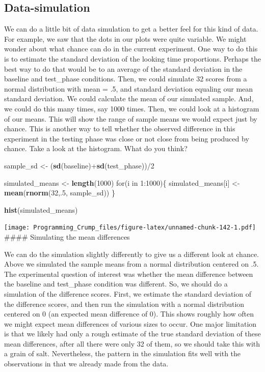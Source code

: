 \documentclass[]{book}
\newenvironment{Shaded}{\begin{snugshade}}{\end{snugshade}}
\newcommand{\KeywordTok}[1]{\textcolor[rgb]{0.13,0.29,0.53}{\textbf{{#1}}}}
\newcommand{\DecValTok}[1]{\textcolor[rgb]{0.00,0.00,0.81}{{#1}}}
\newcommand{\StringTok}[1]{\textcolor[rgb]{0.31,0.60,0.02}{{#1}}}
\newcommand{\NormalTok}[1]{{#1}}
\theoremstyle{definition}
\theoremstyle{definition}
\theoremstyle{definition}
\theoremstyle{remark}
\begin{document}
\subsection{Data-simulation}\label{data-simulation}

We can do a little bit of data simulation to get a better feel for this
kind of data. For example, we saw that the dots in our plots were quite
variable. We might wonder about what chance can do in the current
experiment. One way to do this is to estimate the standard deviation of
the looking time proportions. Perhaps the best way to do that would be
to an average of the standard deviation in the baseline and test\_phase
conditions. Then, we could simulate 32 scores from a normal distribution
with mean = .5, and standard deviation equaling our mean standard
deviation. We could calculate the mean of our simulated sample. And, we
could do this many times, say 1000 times. Then, we could look at a
histogram of our means. This will show the range of sample means we
would expect just by chance. This is another way to tell whether the
observed difference in this experiment in the testing phase was close or
not close from being produced by chance. Take a look at the histogram.
What do you think?

\begin{Shaded}
\begin{Highlighting}[]
\NormalTok{sample_sd   <-}\StringTok{ }\NormalTok{(}\KeywordTok{sd}\NormalTok{(baseline)+}\KeywordTok{sd}\NormalTok{(test_phase))/}\DecValTok{2}

\NormalTok{simulated_means <-}\StringTok{ }\KeywordTok{length}\NormalTok{(}\DecValTok{1000}\NormalTok{)}
\NormalTok{for(i in }\DecValTok{1}\NormalTok{:}\DecValTok{1000}\NormalTok{)\{}
 \NormalTok{simulated_means[i] <-}\StringTok{ }\KeywordTok{mean}\NormalTok{(}\KeywordTok{rnorm}\NormalTok{(}\DecValTok{32}\NormalTok{,.}\DecValTok{5}\NormalTok{, sample_sd))}
\NormalTok{\}}

\KeywordTok{hist}\NormalTok{(simulated_means)}
\end{Highlighting}
\end{Shaded}

\texttt{[image: Programming\_Crump\_files/figure-latex/unnamed-chunk-142-1.pdf]}
\#\#\#\# Simulating the mean differences

We can do the simulation slightly differently to give us a different
look at chance. Above we simulated the sample means from a normal
distribution centered on .5. The experimental question of interest was
whether the mean difference between the baseline and test\_phase
condition was different. So, we should do a simulation of the difference
scores. First, we estimate the standard deviation of the difference
scores, and then run the simulation with a normal distribution centered
on 0 (an expected mean difference of 0). This shows roughly how often we
might expect mean differences of various sizes to occur. One major
limitation is that we likely had only a rough estimate of the true
standard deviation of these mean differences, after all there were only
32 of them, so we should take this with a grain of salt. Nevertheless,
the pattern in the simulation fits well with the observations in that we
already made from the data.
\end{document}
